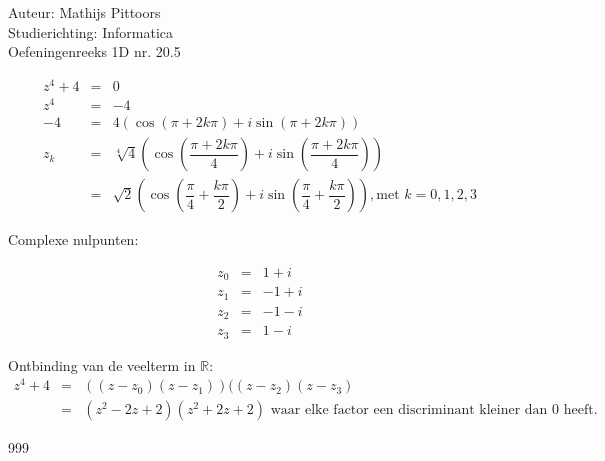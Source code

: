 \documentclass[a4paper]{article}
\begin{document}
  
\noindent \large Auteur: Mathijs Pittoors \\
\noindent \large Studierichting: Informatica\\
\noindent \large Oefeningenreeks 1D nr. 20.5\\

\medskip

\normalsize

\begin{eqnarray*}
z^4 + 4 &=& 0 \\
z^4 &=& -4 \\
-4 &=& 4\left(\cos(\pi + 2k\pi) + i\sin(\pi + 2k\pi)\right)\\
z_k &=& \sqrt[4]{4}
\left(\cos\left(\dfrac{\pi + 2k\pi}{4}\right) + i\sin\left(\dfrac{\pi + 2k\pi}{4}\right)\right) \\
&=& \sqrt{2}\left(\cos\left(\dfrac{\pi}{4} + \dfrac{k\pi}{2}\right) + i\sin\left(\dfrac{\pi}{4} + \dfrac{k\pi}{2}\right) \right), \text{met } k=0,1,2,3
\end{eqnarray*}

Complexe nulpunten:

\begin{eqnarray*}
z_0 &=& 1 + i \\
z_1 &=& -1 + i \\
z_2 &=& -1 - i \\
z_3 &=& 1 - i
\end{eqnarray*}

Ontbinding van de veelterm in $\mathbb{R}$:\\

\begin{eqnarray*}
    z^4 + 4 &=& ((z-z_0) (z-z_1)) ((z-z_2) (z-z_3)\\
    &=& (z^2 - 2z + 2)(z^2 + 2z + 2) \text{ waar elke factor een discriminant kleiner dan 0 heeft.}
\end{eqnarray*}




\begin{thebibliography}{999}
\end{thebibliography}
\end{document}

